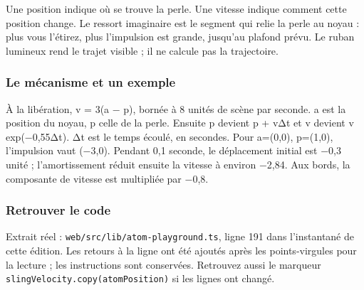 \documentclass[
  canadien,
  11pt,
  letterpaper,
]{article}
\begin{document}
Une position indique où se trouve la perle. Une vitesse indique comment
cette position change. Le ressort imaginaire est le segment qui relie la
perle au noyau : plus vous l'étirez, plus l'impulsion est grande,
jusqu'au plafond prévu. Le ruban lumineux rend le trajet visible ; il ne
calcule pas la trajectoire.

\subsubsection{Le mécanisme et un
exemple}\label{le-muxe9canisme-et-un-exemple}

À la libération, v = 3(a − p), bornée à 8 unités de scène par seconde. a
est la position du noyau, p celle de la perle. Ensuite p devient p + vΔt
et v devient v exp(−0,55Δt). Δt est le temps écoulé, en secondes. Pour
a=(0,0), p=(1,0), l'impulsion vaut (−3,0). Pendant 0,1 seconde, le
déplacement initial est −0,3 unité ; l'amortissement réduit ensuite la
vitesse à environ −2,84. Aux bords, la composante de vitesse est
multipliée par −0,8.

\subsubsection{Retrouver le code}\label{retrouver-le-code}

Extrait réel : \texttt{web/src/lib/atom-playground.ts}, ligne 191 dans
l'instantané de cette édition. Les retours à la ligne ont été ajoutés
après les points-virgules pour la lecture ; les instructions sont
conservées. Retrouvez aussi le marqueur
\texttt{slingVelocity.copy(atomPosition)} si les lignes ont changé.
\end{document}
